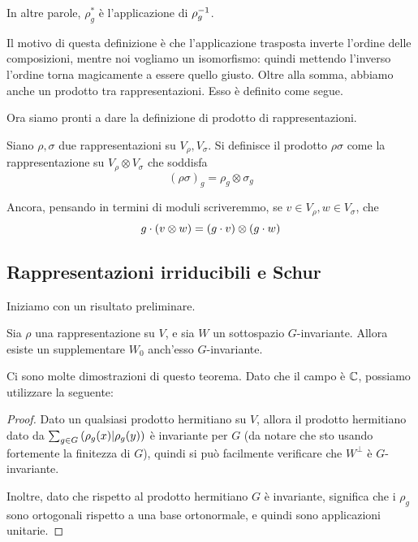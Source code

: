 	In altre parole, $\rho^*_g$ è l'applicazione  di $\rho_g^{-1}$.

	Il motivo di questa definizione è che l'applicazione trasposta inverte l'ordine delle composizioni, mentre noi vogliamo un isomorfismo: quindi mettendo l'inverso l'ordine torna magicamente a essere quello giusto.
	Oltre alla somma, abbiamo anche un prodotto tra rappresentazioni. Esso è definito come segue. 

	Ora siamo pronti a dare la definizione di prodotto di rappresentazioni.

	\begin{mydef}\label{def:RapprProd}
		Siano $\rho,\sigma$ due rappresentazioni su $V_\rho,V_\sigma$. Si definisce il prodotto $\rho\sigma$ come la rappresentazione su $V_\rho \otimes V_\sigma$ che soddisfa
		\[
			(\rho\sigma)_g = \rho_g \otimes \sigma_g
		\]
		
		Ancora, pensando in termini di moduli scriveremmo, se $v\in V_\rho, w\in V_\sigma$, che
		\[
		 g\cdot (v\otimes w) = (g\cdot v) \otimes (g\cdot w)
		\]

	\end{mydef}
	




	\subsection{Rappresentazioni irriducibili e Schur}

	Iniziamo con un risultato preliminare.

	\begin{mytheorem}[Maschke]\label{Th:SupplInv}
		Sia $\rho$ una rappresentazione su $V$, e sia $W$ un sottospazio $G$-invariante. Allora esiste un supplementare $W_0$ anch'esso $G$-invariante.
	\end{mytheorem}
	
	Ci sono molte dimostrazioni di questo teorema. Dato che il campo è $\mathbb C$, possiamo utilizzare la seguente:
	\begin{proof}
		Dato un qualsiasi prodotto hermitiano su $V$, allora il prodotto hermitiano dato da $\sum_{g\in G}\left(\rho_g(x) | \rho_g(y)\right)$ è invariante per $G$ (da notare che sto usando fortemente la finitezza di $G$), quindi si può facilmente verificare che $W^\perp$ è $G$-invariante.
		
		Inoltre, dato che rispetto al prodotto hermitiano $G$ è invariante, significa che i $\rho_g$ sono ortogonali rispetto a una base ortonormale, e quindi sono applicazioni unitarie.
	\end{proof}

